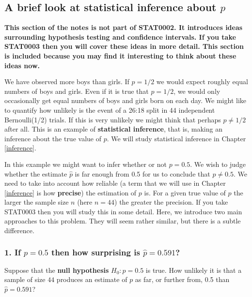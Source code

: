 \documentclass[
  british,
  11pt,
  openany, a4paper]{book}
\begin{document}
\subsection{\texorpdfstring{A brief look at statistical inference about \(p\)}{A brief look at statistical inference about p}}\label{binominf}

\textbf{This section of the notes is not part of STAT0002. It introduces ideas surrounding hypothesis testing and confidence intervals. If you take STAT0003 then you will cover these ideas in more detail. This section is included because you may find it interesting to think about these ideas now.}

We have observed more boys than girls. If \(p=1/2\) we would expect roughly equal numbers of boys and girls. Even if it is true that \(p=1/2\), we would only occasionally get equal numbers of boys and girls born on each day. We might like to quantify how unlikely is the event of a 26:18 split in 44 independent Bernoulli(1/2) trials. If this is very unlikely we might think that perhaps \(p \neq 1/2\) after all. This is an example of \textbf{statistical inference}, that is, making an inference about the true value of \(p\). We will study statistical inference in Chapter \ref{inference}.

In this example we might want to infer whether or not \(p=0.5\). We wish to judge whether the estimate \(\hat{p}\) is far enough from 0.5 for us to conclude that \(p \neq 0.5\). We need to take into account how reliable (a term that we will use in Chapter \ref{inference} is how \textbf{precise}) the estimation of \(p\) is. For a given true value of \(p\) the larger the sample size \(n\) (here \(n = 44\)) the greater the precision. If you take STAT0003 then you will study this in some detail. Here, we introduce two main approaches to this problem. They will seem rather similar, but there is a subtle difference.

\subsubsection*{\texorpdfstring{1. If \(p=0.5\) then how surprising is \(\hat{p}=0.591\)?}{1. If p=0.5 then how surprising is \textbackslash hat\{p\}=0.591?}}\label{if-p0.5-then-how-surprising-is-hatp0.591}

Suppose that the \textbf{null hypothesis} \(H_0: p=0.5\) is true. How unlikely it is that a sample of size \(44\) produces an estimate of \(p\) as far, or further from, 0.5 than \(\hat{p}=0.591\)?
\end{document}
